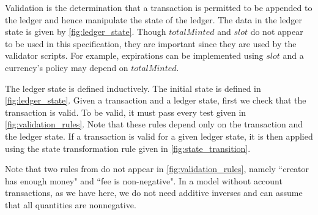 \documentclass[11pt,a4paper]{article}
\newcommand{\var}[1]{\mathit{#1}}
\begin{document}
Validation is the determination that a transaction is permitted to be appended
to the ledger and hence manipulate the state of the ledger.
The data in the ledger state is given by \cref{fig:ledger_state}.
Though $\var{totalMinted}$ and $\var{slot}$ do not appear to be used in this specification,
they are important since they are used by the validator scripts.
For example, expirations can be implemented using $\var{slot}$ and a currency's
policy may depend on $\var{totalMinted}$.

The ledger state is defined inductively.
The initial state is defined in \cref{fig:ledger_state}.
Given a transaction and a ledger state, first we check that
the transaction is valid.
To be valid, it must pass every test given in \cref{fig:validation_rules}.
Note that these rules depend only on the transaction and the ledger state.
If a transaction is valid for a given ledger state, it is then
applied using the state transformation rule given in \cref{fig:state_transition}.

Note that two rules from \cite{multi_currency} do not appear in \cref{fig:validation_rules},
namely ``creator has enough money" and ``fee is non-negative".
In a model without account transactions, as we have here, we do not need additive
inverses and can assume that all quantities are nonnegative.
\end{document}
